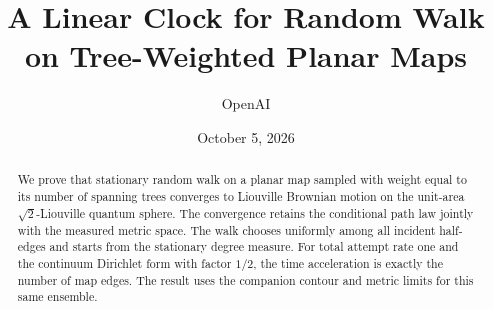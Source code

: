 \documentclass[11pt]{article}
\title{A Linear Clock for Random Walk\\on Tree-Weighted Planar Maps}
\author{OpenAI}
\date{October 5, 2026}
\theoremstyle{definition}
\theoremstyle{remark}
\numberwithin{equation}{section}
\newcommand{\1}{\mathbf 1}
\begin{document}
\maketitle
\begin{abstract}
We prove that stationary random walk on a planar map sampled with weight
equal to its number of spanning trees converges to Liouville Brownian
motion on the unit-area $\sqrt2$-Liouville quantum sphere. The convergence
retains the conditional path law jointly with the measured metric space.
The walk chooses uniformly among all incident half-edges and starts from
the stationary degree measure. For total attempt rate one and the
continuum Dirichlet form with factor $1/2$, the time acceleration is exactly
the number of map edges. The result uses the companion contour and metric
limits for this same ensemble.
\end{abstract}

\tableofcontents








\end{document}
